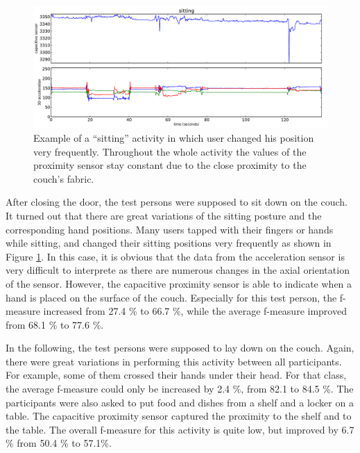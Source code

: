 \documentclass[runningheads,a4paper]{llncs}
\begin{document}
\begin{figure}[htbp]
	\centering
		\includegraphics[width=1.00\textwidth]{../Auswertung/images/eugen_2.pdf}
	\caption{Example of a ``sitting'' activity in which user changed his position very frequently. Throughout the whole activity the values of the proximity sensor stay constant due to the close proximity to the couch's fabric.}
	\label{fig:eugen_2}
\end{figure}

After closing the door, the test persons were supposed to sit down on the couch. It turned out that there are great variations of the sitting posture and the corresponding hand positions. Many users tapped with their fingers or hands while sitting, and changed their sitting positions very frequently as shown in Figure \ref{fig:eugen_2}. In this case, it is obvious that the data from the acceleration sensor is very difficult to interprete as there are numerous changes in the axial orientation of the sensor. However, the capacitive proximity sensor is able to indicate when a hand is placed on the surface of the couch. Especially for this test person, the f-measure increased from 27.4 \% to 66.7 \%, while the average f-measure improved from 68.1 \% to 77.6 \%. 

In the following, the test persons were supposed to lay down on the couch. Again, there were great variations in performing this activity between all participants. For example, some of them crossed their hands under their head. For that class, the average f-measure could only be increased by 2.4 \%, from 82.1 to 84.5 \%. The participants were also asked to put food and dishes from a shelf and a locker on a table. The capacitive proximity sensor captured the proximity to the shelf and to the table. The overall f-measure for this activity is quite low, but improved by 6.7 \% from 50.4 \% to 57.1\%. 
\end{document}
